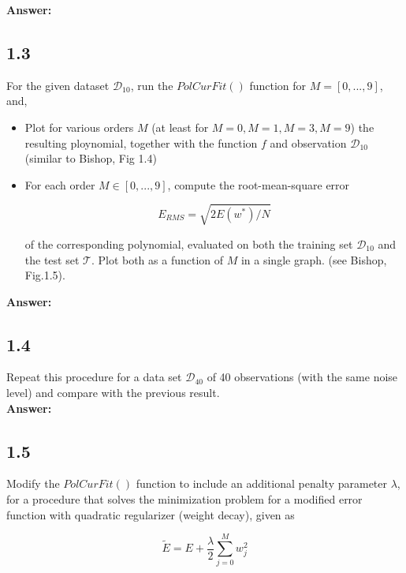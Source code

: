 \documentclass[a4paper]{article}
\begin{document}
\textbf{Answer:}\\

\subsection*{1.3}

For the given dataset $\mathcal{D}_{10}$, run the $PolCurFit()$ function for $M = [0,...,9]$, and,

\begin{itemize}
	\item Plot for various orders $M$ (at least for $M = 0, M = 1, M = 3, M = 9$) the resulting ploynomial, together with the function $f$ and observation $\mathcal{D}_{10}$ (similar to Bishop, Fig 1.4)
	\item For each order $M \in [0,...,9]$, compute the root-mean-square error
	
	\begin{equation}
		E_{RMS} = \sqrt{2E(w^*)/N}
	\end{equation}
	
	of the corresponding polynomial, evaluated on both the training set $\mathcal{D}_{10}$ and the test set $\mathcal{T}$. Plot both as a function of $M$ in a single graph. (see Bishop, Fig.1.5).\\
\end{itemize}

\textbf{Answer:}\\



\subsection*{1.4}


Repeat this procedure for a data set $\mathcal{D}_{40}$ of 40 observations (with the same noise level) and compare with the previous result.\\

\textbf{Answer:}\\


\subsection*{1.5}

Modify the $PolCurFit()$ function to include an additional penalty parameter $\lambda$, for a procedure that solves the minimization problem for a modified error function with quadratic regularizer (weight decay), given as 

\begin{equation}
	\widetilde{E} = E + \frac{\lambda}{2} \sum_{j = 0}^M w_j^2
\end{equation}
\end{document}
